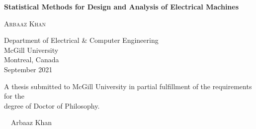 \begin{titlepage}
\onehalfspacing
    \begin{center}
        \vspace*{1cm}
        
        \Huge
        \textbf{Statistical Methods for Design and Analysis of Electrical Machines}
        
        \vspace{1.2cm}
        
        \LARGE
        \textsc{Arbaaz Khan}
        
        \vspace{1.5cm}
        
       
        \vspace{1.5cm}
        \large
        Department of Electrical \& Computer Engineering\\
        McGill University\\
        Montreal, Canada\\
        September 2021
        
\vspace{4.5cm}
\normalsize   
A thesis submitted to McGill University in partial fulfillment of the requirements for the\\
degree of Doctor of Philosophy.
\vspace{1.5cm}

\textcopyright\ \the\year\ Arbaaz Khan
    \end{center}
\end{titlepage}
